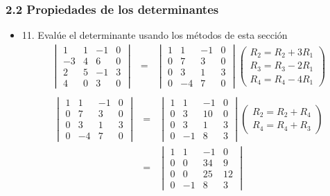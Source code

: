\documentclass[12pt]{article}
\theoremstyle{plain}
\theoremstyle{definition}
\begin{document}
\subsubsection{2.2 Propiedades de los determinantes}
\begin{itemize}
    \item 11. Evalúe el determinante usando los métodos de esta sección
    \begin{eqnarray*}
 \begin{vmatrix}
  1 & 1 & -1 & 0\\
  -3 & 4 & 6 & 0\\
  2 & 5 & -1 & 3\\
  4 & 0 & 3 & 0
 \end{vmatrix}&=&
 \begin{vmatrix}
  1 & 1 & -1 & 0 \\
  0 & 7 & 3 & 0 \\
  0 & 3 & 1 & 3\\
  0 & -4 & 7 & 0
 \end{vmatrix} 
 \begin{pmatrix}
  R_2=R_2+3R_1 \\ 
  R_3=R_3-2R_1 \\
  R_4=R_4-4R_1
 \end{pmatrix}\\
 \end{eqnarray*}
 \begin{eqnarray*}
 \begin{vmatrix}
  1 & 1 & -1 & 0\\
  0 & 7 & 3 & 0\\
  0 & 3 & 1 & 3\\
  0 & -4 & 7 & 0
 \end{vmatrix}
 &=&
 \begin{vmatrix}
  1 & 1 & -1 & 0\\
  0 & 3 & 10 & 0\\
  0 & 3 & 1 & 3\\
  0 & -1 & 8 & 3
 \end{vmatrix}
 \begin{pmatrix}
  R_2=R_2+R_4 \\ 
  R_4=R_4+R_3
 \end{pmatrix}\\
 &=&
 \begin{vmatrix}
  1 & 1 & -1 & 0\\
  0 & 0 & 34 & 9\\
  0 & 0 & 25 & 12\\
  0 & -1 & 8 & 3
 \end{vmatrix}

\end{eqnarray*}
\end{itemize}
\end{document}
